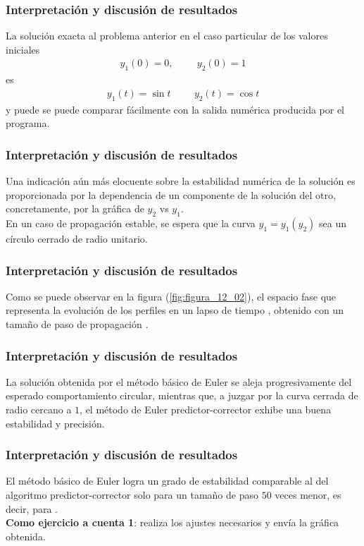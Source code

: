 \begin{frame}
\frametitle{Interpretación y discusión de resultados}
La solución exacta al problema anterior en el caso particular de los valores iniciales 
\begin{align}
y_{1}(0) = 0,  \hspace{1cm} y_{2} (0) = 1
\label{eq:ecuacion_12_22}
\end{align}
es 
\begin{align*}
y_{1}(t) = \sin t \hspace{1cm} y_{2}(t) = \cos t
\end{align*}
y puede se puede comparar fácilmente con la salida numérica producida por el programa.
\end{frame}
\begin{frame}
\frametitle{Interpretación y discusión de resultados}
Una indicación aún más elocuente sobre la estabilidad numérica de la solución es proporcionada por la dependencia de un componente de la solución del otro, concretamente, por la gráfica de $y_{2}$ vs $y_{1}$.
\\
\bigskip
En un caso de propagación estable, se espera que la curva $y_{1} = y_{1} (y_{2})$ sea un círculo cerrado de radio unitario.
\end{frame}
\begin{frame}
\frametitle{Interpretación y discusión de resultados}
Como se puede observar en la figura (\ref{fig:figura_12_02}), el espacio fase que representa la evolución de los perfiles en un lapso de tiempo , obtenido con un tamaño de paso de propagación .
\end{frame}
\begin{frame}
\frametitle{Interpretación y discusión de resultados}
La solución obtenida por el método básico de Euler se aleja progresivamente del esperado comportamiento circular, mientras que, a juzgar por la curva cerrada de radio cercano a $1$, el método de Euler predictor-corrector exhibe una buena estabilidad y precisión.
\end{frame}
\begin{frame}
\frametitle{Interpretación y discusión de resultados}
El método básico de Euler logra un grado de estabilidad comparable al del algoritmo predictor-corrector solo para un tamaño de paso $50$ veces menor, es decir, para .
\\
\bigskip
\textbf{Como ejercicio a cuenta 1}: realiza los ajustes necesarios y envía la gráfica obtenida.
\end{frame}
